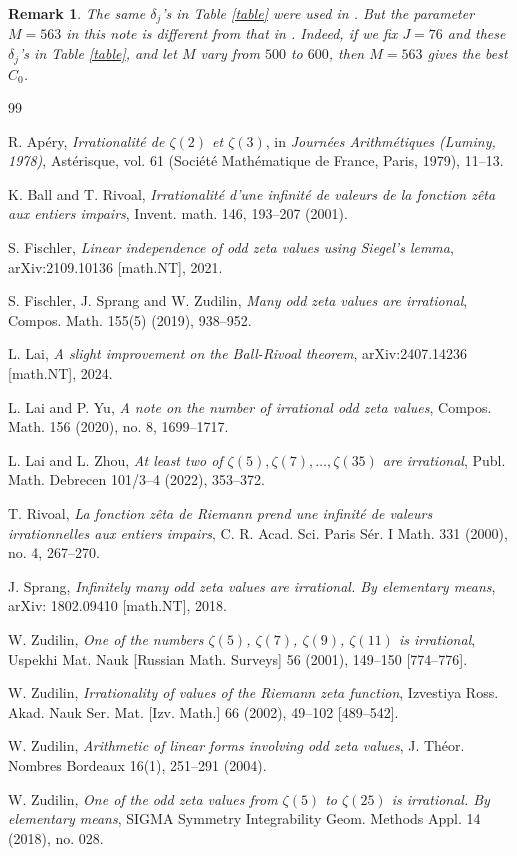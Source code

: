 \documentclass[12pt]{article}
\newtheorem{remark}[theorem]{Remark}
\numberwithin{equation}{section}
\begin{document}
\begin{remark}
The same $\delta_j$'s in Table \ref{table} were used in \cite{Lai2024+}. But the parameter $M=563$ in this note is different from that in \cite{Lai2024+}. Indeed, if we fix $J=76$ and these $\delta_j$'s in Table \ref{table}, and let $M$ vary from $500$ to $600$, then $M=563$ gives the best $C_0$. 
\end{remark}


\begin{thebibliography}{99}

 R. Ap{\'e}ry, \textit{Irrationalit{\'e} de $\zeta(2)$ et $\zeta(3)$}, in \textit{Journ{\'e}es Arithm{\'e}tiques (Luminy, 1978)}, Ast{\'e}risque, vol. 61 (Soci{\'e}t{\'e} Math{\'e}matique de France, Paris, 1979), 11--13.


 K. Ball and T. Rivoal, \textit{Irrationalité d’une infinité de valeurs de la fonction zêta aux entiers impairs}, Invent. math. 146, 193–207 (2001).


 S. Fischler, \textit{Linear independence of odd zeta values using Siegel's lemma}, arXiv:2109.10136 [math.NT], 2021.

  S. Fischler, J. Sprang and W. Zudilin, \textit{Many odd zeta values are irrational}, Compos. Math. 155(5) (2019), 938--952.

 L. Lai, \textit{A slight improvement on the Ball-Rivoal theorem}, arXiv:2407.14236 [math.NT], 2024.

 L. Lai and P. Yu, \textit{A note on the number of irrational odd zeta values}, Compos. Math. 156 (2020), no. 8, 1699--1717.

 L. Lai and L. Zhou, \textit{At least two of $\zeta(5),\zeta(7),\ldots,\zeta(35)$ are irrational}, Publ. Math. Debrecen 101/3--4 (2022), 353--372.


 T. Rivoal, \textit{La fonction z{\^e}ta de Riemann prend une infinit{\'e} de valeurs irrationnelles aux entiers impairs},  C. R. Acad. Sci. Paris S{\'e}r. I Math. 331 (2000), no. 4, 267--270.

 J. Sprang, \textit{Infinitely many odd zeta values are irrational. By elementary means}, arXiv: 1802.09410 [math.NT], 2018.


 W. Zudilin, \textit{One of the numbers $\zeta(5)$, $\zeta(7)$, $\zeta(9)$, $\zeta(11)$ is irrational}, Uspekhi Mat. Nauk [Russian Math. Surveys] 56 (2001), 149--150 [774--776].

 W. Zudilin, \textit{Irrationality of values of the Riemann zeta function}, Izvestiya Ross. Akad. Nauk Ser. Mat. [Izv. Math.] 66 (2002), 49--102 [489--542].

 W. Zudilin, \textit{Arithmetic of linear forms involving odd zeta values}, J. Th{\'e}or. Nombres Bordeaux 16(1), 251--291 (2004).

  W. Zudilin, \textit{One of the odd zeta values from $\zeta(5)$ to $\zeta(25)$ is irrational. By elementary means}, SIGMA Symmetry Integrability Geom. Methods Appl. 14 (2018), no. 028.
\end{thebibliography}
\end{document}
